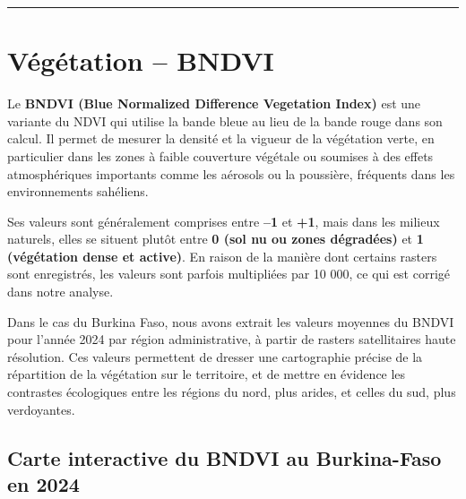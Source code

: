 \documentclass[
]{book}
\begin{document}
\begin{center}\rule{0.5\linewidth}{0.5pt}\end{center}

\section{Végétation -- BNDVI}\label{vuxe9guxe9tation-bndvi}

Le \textbf{BNDVI (Blue Normalized Difference Vegetation Index)} est une variante du NDVI qui utilise la bande bleue au lieu de la bande rouge dans son calcul. Il permet de mesurer la densité et la vigueur de la végétation verte, en particulier dans les zones à faible couverture végétale ou soumises à des effets atmosphériques importants comme les aérosols ou la poussière, fréquents dans les environnements sahéliens.

Ses valeurs sont généralement comprises entre \textbf{--1} et \textbf{+1}, mais dans les milieux naturels, elles se situent plutôt entre \textbf{0 (sol nu ou zones dégradées)} et \textbf{1 (végétation dense et active)}. En raison de la manière dont certains rasters sont enregistrés, les valeurs sont parfois multipliées par 10 000, ce qui est corrigé dans notre analyse.

Dans le cas du Burkina Faso, nous avons extrait les valeurs moyennes du BNDVI pour l'année 2024 par région administrative, à partir de rasters satellitaires haute résolution. Ces valeurs permettent de dresser une cartographie précise de la répartition de la végétation sur le territoire, et de mettre en évidence les contrastes écologiques entre les régions du nord, plus arides, et celles du sud, plus verdoyantes.

\subsection{Carte interactive du BNDVI au Burkina-Faso en 2024}\label{carte-interactive-du-bndvi-au-burkina-faso-en-2024}
\end{document}
